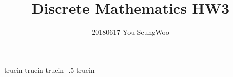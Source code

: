  truein 
 truein 
 truein 
\topmargin -.5 truein 
\textheight 8.5in
\setlength{\parindent}{0pt}
\hypersetup{
	colorlinks=true,
	linkcolor=red,
	filecolor=magenta,      
	urlcolor=cyan,
}


\title{Discrete Mathematics HW3}
\author{20180617 You SeungWoo}